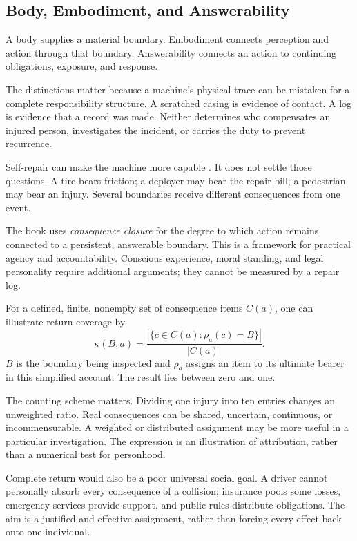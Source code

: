 \documentclass[11pt,openany]{book}
\begin{document}
\subsection{Body, Embodiment, and Answerability}

A body supplies a material boundary. Embodiment connects perception and action through that boundary. Answerability connects an action to continuing obligations, exposure, and response.

The distinctions matter because a machine's physical trace can be mistaken for a complete responsibility structure. A scratched casing is evidence of contact. A log is evidence that a record was made. Neither determines who compensates an injured person, investigates the incident, or carries the duty to prevent recurrence.

Self-repair can make the machine more capable \cite{terryn2017self}. It does not settle those questions. A tire bears friction; a deployer may bear the repair bill; a pedestrian may bear an injury. Several boundaries receive different consequences from one event.

The book uses \emph{consequence closure} for the degree to which action remains connected to a persistent, answerable boundary. This is a framework for practical agency and accountability. Conscious experience, moral standing, and legal personality require additional arguments; they cannot be measured by a repair log.

For a defined, finite, nonempty set of consequence items $C(a)$, one can illustrate return coverage by
\begin{equation}
 \kappa(B,a)=
 \frac{\left|\{c\in C(a):\rho_a(c)=B\}\right|}
      {|C(a)|}.
\end{equation}
$B$ is the boundary being inspected and $\rho_a$ assigns an item to its ultimate bearer in this simplified account. The result lies between zero and one.

The counting scheme matters. Dividing one injury into ten entries changes an unweighted ratio. Real consequences can be shared, uncertain, continuous, or incommensurable. A weighted or distributed assignment may be more useful in a particular investigation. The expression is an illustration of attribution, rather than a numerical test for personhood.

Complete return would also be a poor universal social goal. A driver cannot personally absorb every consequence of a collision; insurance pools some losses, emergency services provide support, and public rules distribute obligations. The aim is a justified and effective assignment, rather than forcing every effect back onto one individual.
\end{document}
